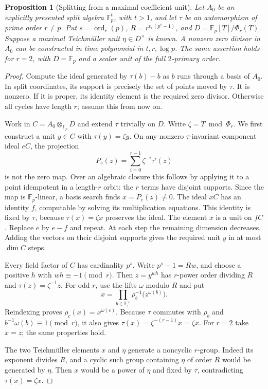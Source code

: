 \documentclass[11pt]{article}
\newcommand{\F}{\mathbb F}
\newcommand{\ord}{\operatorname{ord}}
\newtheorem{proposition}[theorem]{Proposition}
\theoremstyle{definition}
\theoremstyle{remark}
\begin{document}
\begin{proposition}[Splitting from a maximal coefficient unit]
\label{prop:zerodivisor}
Let $A_0$ be an explicitly presented split algebra
$\F_p^t$, with $t>1$, and let $\tau$ be an automorphism
of prime order $r\ne p$.  Put
$s=\ord_r(p)$, $R=r^{v_r(p^s-1)}$, and
$D=\F_p[T]/\Phi_r(T)$.
Suppose a maximal Teichm\"uller unit $\eta\in D^\times$
is known.  A nonzero zero divisor in $A_0$ can be
constructed in time polynomial in $t,r,\log p$.
The same assertion holds for $r=2$, with $D=\F_p$
and a scalar unit of the full $2$-primary order.
\end{proposition}
\begin{proof}
Compute the ideal generated by $\tau(b)-b$ as $b$
runs through a basis of $A_0$.  In split coordinates,
its support is precisely the set of points moved by
$\tau$.  It is nonzero.  If it is proper, its identity
element is the required zero divisor.  Otherwise all
cycles have length $r$; assume this from now on.

Work in $C=A_0\otimes_{\F_p}D$ and extend $\tau$
trivially on $D$.  Write $\zeta=T\bmod\Phi_r$.
We first construct a unit $y\in C$ with
$\tau(y)=\zeta y$.
On any nonzero $\tau$-invariant component ideal $eC$,
the projection
\[
 P_e(z)=\sum_{i=0}^{r-1}\zeta^{-i}\tau^i(z)
\]
is not the zero map.  Over an algebraic closure this
follows by applying it to a point idempotent in a
length-$r$ orbit: the $r$ terms have disjoint supports.
Since the map is $\F_p$-linear, a basis search finds
$x=P_e(z)\ne0$.  The ideal $xC$ has an identity $f$,
computable by solving its multiplication equations.
This identity is fixed by $\tau$, because
$\tau(x)=\zeta x$ preserves the ideal.  The element
$x$ is a unit on $fC$.  Replace $e$ by $e-f$ and
repeat.  At each step the remaining dimension decreases.
Adding the vectors on their disjoint supports gives
the required unit $y$ in at most $\dim C$ steps.

Every field factor of $C$ has cardinality $p^s$.
Write $p^s-1=Rw$, and choose a positive $h$ with
$wh\equiv-1\pmod r$.  Then $z=y^{wh}$ has
$r$-power order dividing $R$ and
$\tau(z)=\zeta^{-1}z$.
For odd $r$, use the lifts $\omega$ modulo $R$ and put
\[
 x=\prod_{b\in\F_r^\times}
          \rho_b^{-1}\bigl(z^{\omega(b)}\bigr).
\]
Reindexing proves $\rho_c(x)=x^{\omega(c)}$.
Because $\tau$ commutes with $\rho_b$ and
$b^{-1}\omega(b)\equiv1\pmod r$, it also gives
$\tau(x)=\zeta^{-(r-1)}x=\zeta x$.
For $r=2$ take $x=z$; the same properties hold.

The two Teichm\"uller elements $x$ and $\eta$ generate
a noncyclic $r$-group.  Indeed its exponent divides $R$,
and a cyclic such group containing $\eta$ of order
$R$ would be generated by $\eta$.  Then $x$ would be
a power of $\eta$ and fixed by $\tau$, contradicting
$\tau(x)=\zeta x$.


\end{proof}
\end{document}
